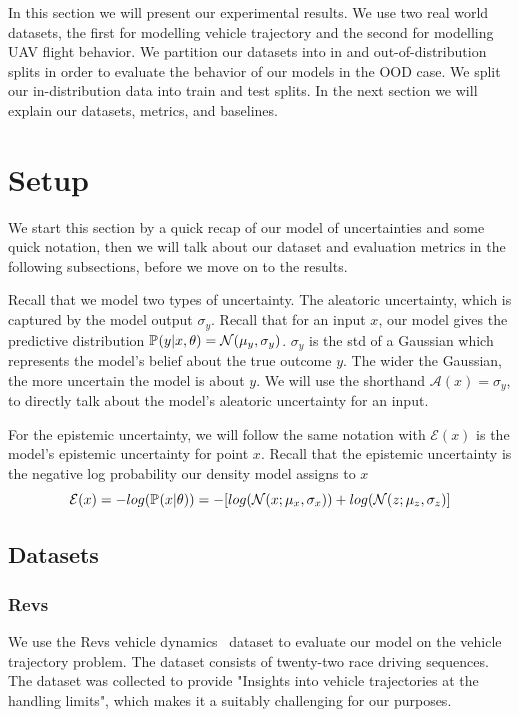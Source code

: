 \documentclass[../main.tex]{subfiles}
\begin{document}
{}

In this section we will present our experimental results. We use two real world datasets, the first for modelling vehicle trajectory and the second for modelling UAV flight behavior.
We partition our datasets into in and out-of-distribution splits in order to evaluate the behavior of our models in the OOD case. We split our in-distribution data into train and test splits.  
In the next section we will explain our datasets, metrics, and baselines. 

\section{Setup}

We start this section by a quick recap of our model of uncertainties and some quick notation, then we will talk about our dataset and evaluation metrics in the following subsections, before we move on to the results.

Recall that we model two types of uncertainty. The aleatoric uncertainty, which is captured by the model output $\sigma_y$. Recall that for an input $x$, our model gives the predictive distribution $\mathbb{P}_{}(y|x, \theta) = \mathcal{N}(\mu_y, \sigma_y)$. 
$\sigma_y$ is the std of a Gaussian which represents the model's belief about the true outcome $y$. The wider the Gaussian, the more uncertain the model is about $y$. We will use the shorthand $\mathcal{A}(x) = \sigma_y$, to directly talk about the model's aleatoric uncertainty for an input.

For the epistemic uncertainty, we will follow the same notation with $\mathcal{E}(x)$ is the model's epistemic uncertainty for point $x$. Recall that the epistemic uncertainty is the negative log probability our density model assigns to $x$ 
$$
    \mathcal{E}(x) = -log(\mathbb{P}_{}(x|\theta)) 
    = -[log(\mathcal{N}(x; \mu_{x}, \sigma_{x}) ) + log(\mathcal{N}(z; \mu_{z}, \sigma_{z})]
$$

\subsection{Datasets}
\subsubsection{Revs}
We use the Revs vehicle dynamics~\citep{doi:10.1080/00423114.2016.1249893} dataset to evaluate our model on the vehicle trajectory problem. The dataset consists of twenty-two race driving sequences. The dataset was collected to provide "Insights into vehicle trajectories at the handling limits", which makes it a suitably challenging for our purposes. 
\end{document}
